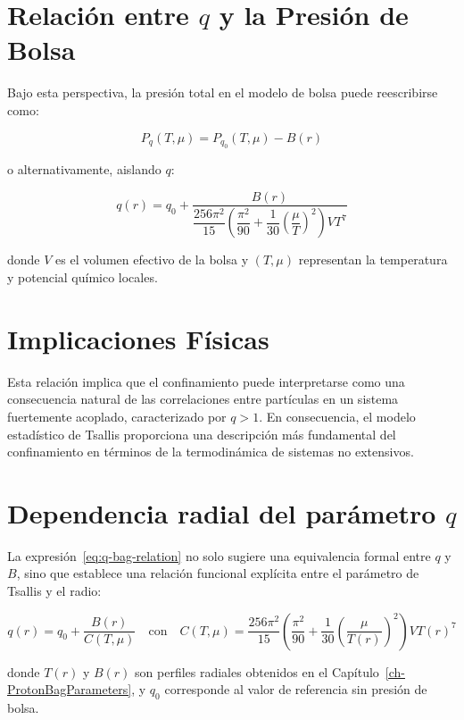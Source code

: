 \break

\section{Relaci\'on entre \( q \) y la Presi\'on de Bolsa}
Bajo esta perspectiva, la presi\'on total en el modelo de bolsa puede reescribirse como:

\begin{equation}
P_q(T,\mu) = P_{q_0}(T,\mu) - B(r)
\end{equation}

o alternativamente, aislando \( q \):

\begin{equation}
q(r) = q_0 + \frac{B(r)}{\dfrac{256 \pi^2}{15} \left( \dfrac{\pi^2}{90} + \dfrac{1}{30} \left( \dfrac{\mu}{T} \right)^2 \right) V T^7}
\label{eq:q-bag-relation}
\end{equation}

donde \( V \) es el volumen efectivo de la bolsa y \( (T, \mu) \) representan la temperatura y potencial qu\'imico locales.

\section{Implicaciones F\'isicas}
Esta relaci\'on implica que el confinamiento puede interpretarse como una consecuencia natural de las correlaciones entre part\'iculas en un sistema fuertemente acoplado, caracterizado por \( q > 1 \). En consecuencia, el modelo estad\'istico de Tsallis proporciona una descripci\'on m\'as fundamental del confinamiento en t\'erminos de la termodin\'amica de sistemas no extensivos.

\section{Dependencia radial del par\'ametro \( q \)}

La expresi\'on~\eqref{eq:q-bag-relation} no solo sugiere una equivalencia formal entre \( q \) y \( B \), sino que establece una relaci\'on funcional expl\'icita entre el par\'ametro de Tsallis y el radio:

\[
q(r) = q_0 + \frac{B(r)}{C(T,\mu)}
\quad \text{con} \quad
C(T,\mu) = \frac{256 \pi^2}{15} \left( \frac{\pi^2}{90} + \frac{1}{30} \left( \frac{\mu}{T(r)} \right)^2 \right) V T(r)^7
\]

donde \( T(r) \) y \( B(r) \) son perfiles radiales obtenidos en el Cap\'itulo~\ref{ch-ProtonBagParameters}, y \( q_0 \) corresponde al valor de referencia sin presi\'on de bolsa.

